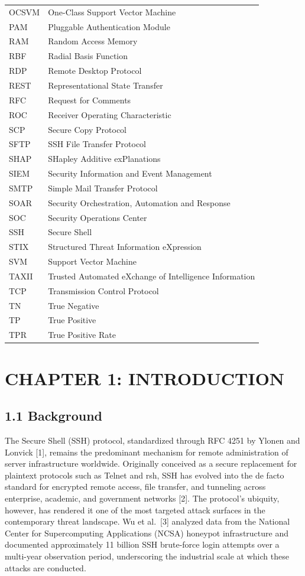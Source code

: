 \documentclass[
  a4paper]{report}
\begin{document}
{\begin{longtable}[]{@{}ll@{}}
OCSVM & One-Class Support Vector Machine \\
PAM & Pluggable Authentication Module \\
RAM & Random Access Memory \\
RBF & Radial Basis Function \\
RDP & Remote Desktop Protocol \\
REST & Representational State Transfer \\
RFC & Request for Comments \\
ROC & Receiver Operating Characteristic \\
SCP & Secure Copy Protocol \\
SFTP & SSH File Transfer Protocol \\
SHAP & SHapley Additive exPlanations \\
SIEM & Security Information and Event Management \\
SMTP & Simple Mail Transfer Protocol \\
SOAR & Security Orchestration, Automation and Response \\
SOC & Security Operations Center \\
SSH & Secure Shell \\
STIX & Structured Threat Information eXpression \\
SVM & Support Vector Machine \\
TAXII & Trusted Automated eXchange of Intelligence Information \\
TCP & Transmission Control Protocol \\
TN & True Negative \\
TP & True Positive \\
TPR & True Positive Rate \\
\end{longtable}
}

\chapter{CHAPTER 1: INTRODUCTION}\label{chapter-1-introduction}

\section{1.1 Background}\label{background}

The Secure Shell (SSH) protocol, standardized through RFC 4251 by Ylonen
and Lonvick {[}1{]}, remains the predominant mechanism for remote
administration of server infrastructure worldwide. Originally conceived
as a secure replacement for plaintext protocols such as Telnet and rsh,
SSH has evolved into the de facto standard for encrypted remote access,
file transfer, and tunneling across enterprise, academic, and government
networks {[}2{]}. The protocol's ubiquity, however, has rendered it one
of the most targeted attack surfaces in the contemporary threat
landscape. Wu et al.~{[}3{]} analyzed data from the National Center for
Supercomputing Applications (NCSA) honeypot infrastructure and
documented approximately 11 billion SSH brute-force login attempts over
a multi-year observation period, underscoring the industrial scale at
which these attacks are conducted.
\end{document}
